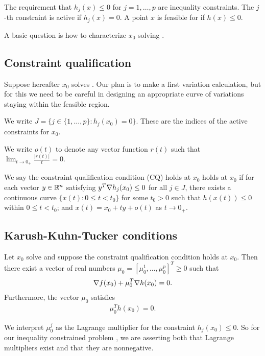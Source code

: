 The requirement that $h_j(x) \le 0$ for $j = 1, \dots, p$ are inequality constraints.
The $j$-th constraint is active if $h_j(x) = 0$.
A point $x$ is feasible for  if $h(x) \le 0$.

A basic question is how to characterize $x_0$ solving .

\subsection{Constraint qualification}

Suppose hereafter $x_0$ solves .
Our plan is to make a first variation calculation, but for this we need to be careful in designing an appropriate curve of variations staying within the feasible region.

We write $J = \{ j \in \{1, \dots, p\} : h_j(x_0) = 0 \}$.
These are the indices of the active constraints for $x_0$.

We write $o(t)$ to denote any vector function $r(t)$ such that $\lim _ {t \to 0_+} \frac{|r(t)|}{t} = 0$.

\begin{definition}
We say the constraint qualification condition (CQ) holds at $x_0$ holds at $x_0$ if for each vector $y \in \mathbb{R}^n$ satisfying $y^T \nabla h_j(x_0) \le 0$ for all $j \in J$, there exists a continuous curve $\{x(t) : 0 \le t < t_0 \}$ for some $t_0 > 0$ such that $h(x(t)) \le 0$ within $0 \le t < t_0$; and $x(t) = x_0 + t y + o(t)$ as $t \to 0_+$.
\end{definition}

\subsection{Karush-Kuhn-Tucker conditions}

\begin{theorem}
Let $x_0$ solve  and suppose the constraint qualification condition holds at $x_0$.
Then there exist a vector of real numbers $\mu_0 = [\mu_0^1, \dots, \mu_0^p]^T \ge 0$ such that 
\begin{align}
\nabla f(x_0) + \mu_0^T \nabla h(x_0) = 0.
\end{align}
Furthermore, the vector $\mu_0$ satisfies
\begin{align}
\mu_0^T h(x_0) = 0.
\end{align}
\end{theorem}

We interpret $\mu_0^j$ as the Lagrange multiplier for the constraint $h_j(x_0) \le 0$. 
So for our inequality constrained problem , we are asserting both that Lagrange multipliers exist and that they are nonnegative.

